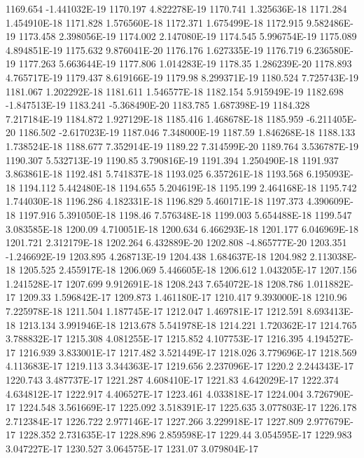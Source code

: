 1169.654  -1.441032E-19
1170.197  4.822278E-19
1170.741  1.325636E-18
1171.284  1.454910E-18
1171.828  1.576560E-18
1172.371  1.675499E-18
1172.915  9.582486E-19
1173.458  2.398056E-19
1174.002  2.147080E-19
1174.545  5.996754E-19
1175.089  4.894851E-19
1175.632  9.876041E-20
1176.176  1.627335E-19
1176.719  6.236580E-19
1177.263  5.663644E-19
1177.806  1.014283E-19
1178.35  1.286239E-20
1178.893  4.765717E-19
1179.437  8.619166E-19
1179.98  8.299371E-19
1180.524  7.725743E-19
1181.067  1.202292E-18
1181.611  1.546577E-18
1182.154  5.915949E-19
1182.698  -1.847513E-19
1183.241  -5.368490E-20
1183.785  1.687398E-19
1184.328  7.217184E-19
1184.872  1.927129E-18
1185.416  1.468678E-18
1185.959  -6.211405E-20
1186.502  -2.617023E-19
1187.046  7.348000E-19
1187.59  1.846268E-18
1188.133  1.738524E-18
1188.677  7.352914E-19
1189.22  7.314599E-20
1189.764  3.536787E-19
1190.307  5.532713E-19
1190.85  3.790816E-19
1191.394  1.250490E-18
1191.937  3.863861E-18
1192.481  5.741837E-18
1193.025  6.357261E-18
1193.568  6.195093E-18
1194.112  5.442480E-18
1194.655  5.204619E-18
1195.199  2.464168E-18
1195.742  1.744030E-18
1196.286  4.182331E-18
1196.829  5.460171E-18
1197.373  4.390609E-18
1197.916  5.391050E-18
1198.46  7.576348E-18
1199.003  5.654488E-18
1199.547  3.083585E-18
1200.09  4.710051E-18
1200.634  6.466293E-18
1201.177  6.046969E-18
1201.721  2.312179E-18
1202.264  6.432889E-20
1202.808  -4.865777E-20
1203.351  -1.246692E-19
1203.895  4.268713E-19
1204.438  1.684637E-18
1204.982  2.113038E-18
1205.525  2.455917E-18
1206.069  5.446605E-18
1206.612  1.043205E-17
1207.156  1.241528E-17
1207.699  9.912691E-18
1208.243  7.654072E-18
1208.786  1.011882E-17
1209.33  1.596842E-17
1209.873  1.461180E-17
1210.417  9.393000E-18
1210.96  7.225978E-18
1211.504  1.187745E-17
1212.047  1.469781E-17
1212.591  8.693413E-18
1213.134  3.991946E-18
1213.678  5.541978E-18
1214.221  1.720362E-17
1214.765  3.788832E-17
1215.308  4.081255E-17
1215.852  4.107753E-17
1216.395  4.194527E-17
1216.939  3.833001E-17
1217.482  3.521449E-17
1218.026  3.779696E-17
1218.569  4.113683E-17
1219.113  3.344363E-17
1219.656  2.237096E-17
1220.2  2.244343E-17
1220.743  3.487737E-17
1221.287  4.608410E-17
1221.83  4.642029E-17
1222.374  4.634812E-17
1222.917  4.406527E-17
1223.461  4.033818E-17
1224.004  3.726790E-17
1224.548  3.561669E-17
1225.092  3.518391E-17
1225.635  3.077803E-17
1226.178  2.712384E-17
1226.722  2.977146E-17
1227.266  3.229918E-17
1227.809  2.977679E-17
1228.352  2.731635E-17
1228.896  2.859598E-17
1229.44  3.054595E-17
1229.983  3.047227E-17
1230.527  3.064575E-17
1231.07  3.079804E-17
